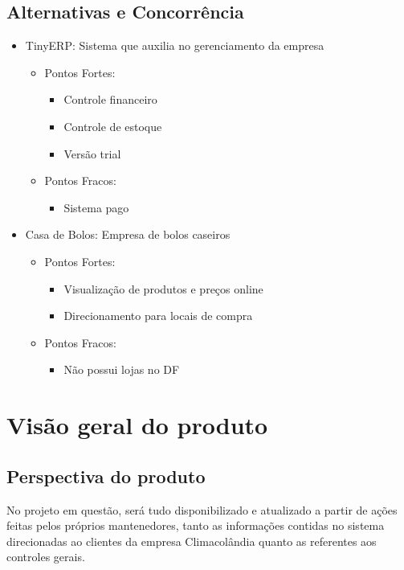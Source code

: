 \subsection{Alternativas e Concorrência}

\begin{itemize}
	\item TinyERP: Sistema que auxilia no gerenciamento da empresa \cite{tinyerp}
	\begin{itemize}
		\item Pontos Fortes:
		\begin{itemize}
			\item Controle financeiro
			\item Controle de estoque
			\item Versão trial
		\end{itemize}
		\item Pontos Fracos:
		\begin{itemize}
			\item Sistema pago
		\end{itemize}
	\end{itemize}
	\item Casa de Bolos: Empresa de bolos caseiros \cite{bolo}
	\begin{itemize}
		\item Pontos Fortes:
		\begin{itemize}
			\item Visualização de produtos e preços online
			\item Direcionamento para locais de compra
		\end{itemize}
		\item Pontos Fracos:
		\begin{itemize}
			\item Não possui lojas no DF
		\end{itemize}
	\end{itemize}
\end{itemize}

\section{Visão geral do produto}
\subsection{Perspectiva do produto}

No projeto em questão, será tudo disponibilizado e atualizado a partir de ações feitas pelos próprios mantenedores, tanto as informações contidas no sistema direcionadas ao clientes da empresa Climacolândia quanto as referentes aos controles gerais.

